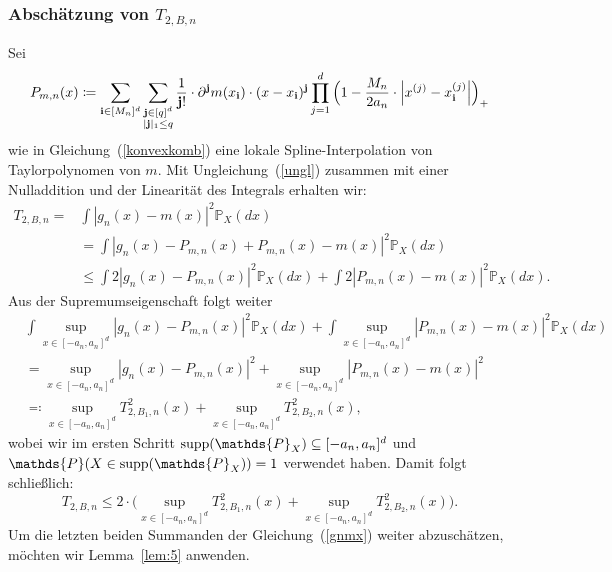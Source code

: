 \subsubsection{Abschätzung von $T_{2,B,n}$}
Sei 
\begin{equation*}
\begin{split}
P_{m,n}(x) \coloneqq \sum_{\mathbf{i} \in [M_n]^d} \sum_{\substack{ \mathbf{j} \in [q]^d \\ |\mathbf{j}|_1 \leq q}} \frac{1}{\mathbf{j}!} \cdot \partial^{\mathbf{j}} m (x_{\mathbf{i}}) \cdot (x - x_{\mathbf{i}})^{\mathbf{j}} \prod_{j = 1}^d\Big(1 - \frac{M_n}{2a_n} \cdot \Big|x^{(j)} - x_{\mathbf{i}}^{(j)}\Big|\Big)_+
\end{split}
\end{equation*}
wie in Gleichung~(\ref{konvexkomb}) eine lokale Spline-Interpolation von Taylorpolynomen von $m$.
Mit Ungleichung~(\ref{ungl}) zusammen mit einer Nulladdition und der Linearität des Integrals erhalten wir:
\begin{equation*}
\begin{split}
T_{2,B,n} = & \int |g_n(x) - m(x)|^2 \mathds{P}_X(dx) \\
& = \int |g_n(x) - P_{m,n}(x) + P_{m,n}(x) - m(x)|^2 \mathds{P}_X(dx) \\
& \leq \int 2 |g_n(x) - P_{m,n}(x)|^2 \mathds{P}_X(dx) + \int 2 |P_{m,n}(x) - m(x)|^2 \mathds{P}_X(dx).
\end{split}
\end{equation*}
Aus der Supremumseigenschaft folgt weiter
\begin{equation}
\label{gnmx}
\begin{split}
&  \int \sup_{x \in [-a_n, a_n]^d} |g_n(x) - P_{m,n}(x)|^2 \mathds{P}_X(dx) +  \int \sup_{x \in [-a_n, a_n]^d} |P_{m,n}(x) - m(x)|^2 \mathds{P}_X(dx) \\
& =  \sup_{x \in [-a_n, a_n]^d} |g_n(x) - P_{m,n}(x)|^2 +  \sup_{x \in [-a_n, a_n]^d} |P_{m,n}(x) - m(x)|^2  \\
& \eqqcolon  \sup_{x \in [-a_n, a_n]^d} T_{2,B_1,n}^2(x) +  \sup_{x \in [-a_n, a_n]^d} T_{2,B_2,n}^2(x),
\end{split}
\end{equation}
wobei wir im ersten Schritt $\supp(\mathds{P}_X) \subseteq [-a_n, a_n]^d$ und $\mathds{P}(X \in \supp(\mathds{P}_X)) = 1$ verwendet haben. Damit folgt schließlich:
$$T_{2,B,n} \leq 2 \cdot \Big(\sup_{x \in [-a_n, a_n]^d} T_{2,B_1,n}^2(x) +  \sup_{x \in [-a_n, a_n]^d} T_{2,B_2,n}^2(x)\Big).$$
Um die letzten beiden Summanden der Gleichung~(\ref{gnmx}) weiter abzuschätzen, möchten wir Lemma~\ref{lem:5} anwenden. 

